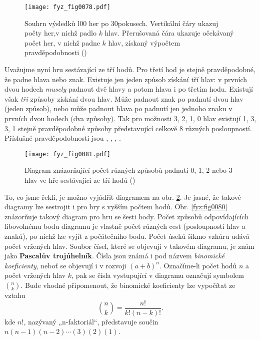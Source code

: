     \begin{figure}[ht!]  %
      \centering
      \texttt{[image: fyz\_fig0078.pdf]}
      \caption{Souhrn výsledků l00 her po 30pokusech. Vertikální čáry ukazuj počty her,v nichž 
              padlo \(k\) hlav. Přerušovaná čára ukazuje očekávaný počet her, v nichž padne \(k\) 
              hlav, získaný výpočtem pravděpodobnosti (\cite[s.~80]{Feynman01})}
      \label{fyz:fig0078}
    \end{figure}
    
    Uvažujme nyní hru sestávající ze tří hodů. Pro třetí hod je stejně pravděpodobné, že padne 
    hlava nebo znak. Existuje jen jeden způsob získání tří hlav: v prvních dvou hodech 
    \emph{musely} padnout dvě hlavy a potom hlava i po třetím hodu. Existují však \emph{tři} 
    způsoby získání dvou hlav. Může padnout znak po padnutí dvou hlav (jeden způsob), nebo může 
    padnout hlava po padnutí jen jednoho znaku v prvních dvou hodech (dva způsoby). Tak pro možnosti
    \num{3}, \num{2}, \num{1}, \num{0} hlav existují \num{1}, \num{3}, \num{3}, \num{1} stejně 
    pravděpodobné způsoby představující celkově \num{8} různých posloupností. Příslušné 
    pravděpodobnosti jsou , , , .

    \begin{figure}[ht!]  %
      \centering
      \texttt{[image: fyz\_fig0081.pdf]}
      \caption{Diagram znázorňující počet různých způsobů padnutí \num{0}, \num{1}, \num{2} nebo 
              \num{3} hlav ve hře sestávající ze tří hodů (\cite[s.~81]{Feynman01})}
      \label{fyz:fig0081}
    \end{figure}
    
    To, co jsme řekli, je možno vyjádřit diagramem na obr. \ref{fyz:fig0081}. Je jasné, že takové 
    diagramy lze sestrojit i pro hry s vyšším počtem hodů. Obr. \ref{fyz:fig0080} znázorňuje takový 
    diagram pro hru se šesti hody. Počet způsobů odpovídajících libovolnému bodu diagramu je 
    vlastně počet různých cest (posloupností hlav a znaků), po nichž lze vyjít z počátečního bodu. 
    Počet úseků šikmo vzhůru udává počet vržených hlav. Soubor čísel, které se objevují v takovém 
    diagramu, je znám jako \textbf{Pascalův trojúhelník}. Čísla jsou známá i pod názvem 
    \emph{binomické koeficienty}, neboť se objevují i v rozvoji \((a + b)^n\). Označíme-li počet 
    hodů \(n\) a počet vržených hlav \(k\), pak se čísla vystupující v diagramu označují symbolem  
    \(\binom{n}{k}\). Bude vhodné připomenout, že binomické koeficienty 
    lze vypočítat ze vztahu
    \begin{equation}\label{fyz:eq074}
      \binom{n}{k} = \frac{n!}{k!(n-k)!}.
    \end{equation}
    kde \(n!\), nazývaný „n-faktoriál“, představuje součin \(n(n- 1)(n-2)\cdots (3)(2)(1)\).
    
